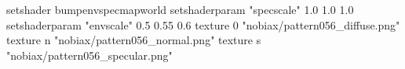 setshader bumpenvspecmapworld
setshaderparam "specscale" 1.0 1.0 1.0
setshaderparam "envscale"  0.5 0.55 0.6
    texture 0 "nobiax/pattern056_diffuse.png"
    texture n "nobiax/pattern056_normal.png"
    texture s "nobiax/pattern056_specular.png"